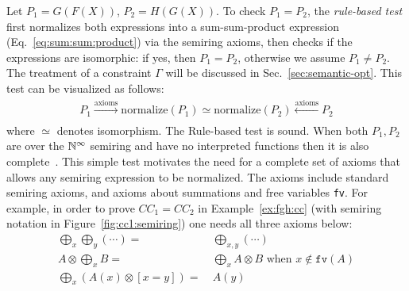 %
Let $P_{1} = G(F(X))$, $P_{2} = H(G(X))$.  To check $P_1=P_2$, the
{\em rule-based test} first normalizes both expressions into a
sum-sum-product expression (Eq.~\eqref{eq:sum:sum:product})
via the semiring axioms, then checks if the expressions are isomorphic:
if yes, then $P_{1} = P_{2}$, otherwise we assume $P_{1}\neq P_{2}$.
The treatment of  a constraint $\Gamma$ will be discussed in Sec.~\ref{sec:semantic-opt}.
This test can be visualized as follows:
%
\begin{align}
  P_{1} \xrightarrow[]{\text{axioms}} \text{normalize}(P_{1})
  \simeq
  \text{normalize}(P_{2}) \xleftarrow[]{\text{axioms}} P_{2}
\label{eq:equality:isomorphism}
\end{align}
%
where $\simeq$ denotes isomorphism.  The Rule-based test is sound.
When both $P_1, P_2$ are over the
$\mathbb N^\infty$ semiring and have no interpreted functions then it
is also
complete~\cite{DBLP:conf/icdt/Green09,DBLP:journals/pvldb/WangHSHL20}.
%
This simple test motivates the need for a complete set of axioms that
allows any semiring expression to be normalized.  The axioms include
standard semiring axioms, and axioms about summations and free
variables \texttt{fv}.  For example, in order to
prove $CC_1 = CC_2$ in Example~\ref{ex:fgh:cc} (with
semiring notation in Figure~\ref{fig:cc1:semiring}) one needs
all three axioms below:
%
\begin{align}
  \bigoplus_x \bigoplus_y \left(\cdots\right) = \ &  \bigoplus_{x,y}\left( \cdots \right)  \label{eq:axiom:plus:plus} \\
  A \otimes \bigoplus_{x} B = \ & \bigoplus_{x} A \otimes B \text{ when } x \not \in \texttt{fv}(A) \label{eq:axiom:pullmul}\\
  \bigoplus_x \left(A(x) \otimes [x=y]\right) = \ & A(y)  \label{eq:axiom:plus:equal}
\end{align}
%

